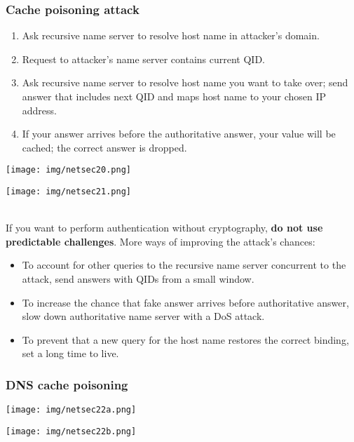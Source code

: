 \documentclass[a4paper, 10pt, titlepage]{article}
\begin{document}
\subsubsection{Cache poisoning attack}
\begin{enumerate}
	\item Ask recursive name server to resolve host name in attacker’s 	domain.
	\item Request to attacker’s name server contains current QID.
	\item Ask recursive name server to resolve host name you want to take over; send answer that includes next QID and maps host name to your chosen IP address.
	\item If your answer arrives before the authoritative answer, your value 	will be cached; the correct answer is dropped.
\end{enumerate}
\begin{minipage}{0.25\textwidth}
	\begin{center}
		\texttt{[image: img/netsec20.png]}
	\end{center}
\end{minipage}
\hfill
\begin{minipage}{0.75\textwidth}
	\begin{center}
		\texttt{[image: img/netsec21.png]}
	\end{center}
\end{minipage} \medskip\\
If you want to perform authentication without cryptography, \textbf{do not use predictable challenges}. More ways of improving the attack’s chances:
\begin{itemize}
	\item To account for other queries to the recursive name server concurrent to the attack, send answers with QIDs from a small window.
	\item To increase the chance that fake answer arrives before authoritative answer, slow down authoritative name server with a DoS attack.
	\item To prevent that a new query for the host name restores the correct binding, set a long time to live.
\end{itemize}

\subsubsection{DNS cache poisoning}
\begin{center}
	\texttt{[image: img/netsec22a.png]}
\end{center}
\begin{center}
	\texttt{[image: img/netsec22b.png]}
\end{center}
\end{document}
